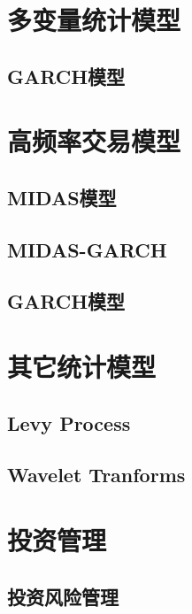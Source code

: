 \documentclass[]{book}
\theoremstyle{definition}
\theoremstyle{definition}
\theoremstyle{definition}
\theoremstyle{remark}
\begin{document}
\section{多变量统计模型}

\subsection{GARCH模型}\label{garch-1}

\subsection{}\label{section}

\section{高频率交易模型}

\subsection{MIDAS模型}\label{midas}

\subsection{MIDAS-GARCH}\label{midas-garch}

\subsection{GARCH模型}\label{garch-2}

\section{其它统计模型}

\subsection{Levy Process}\label{levy-process}

\subsection{Wavelet Tranforms}\label{wavelet-tranforms}

\section{投资管理}

\subsection{投资风险管理}
\end{document}
